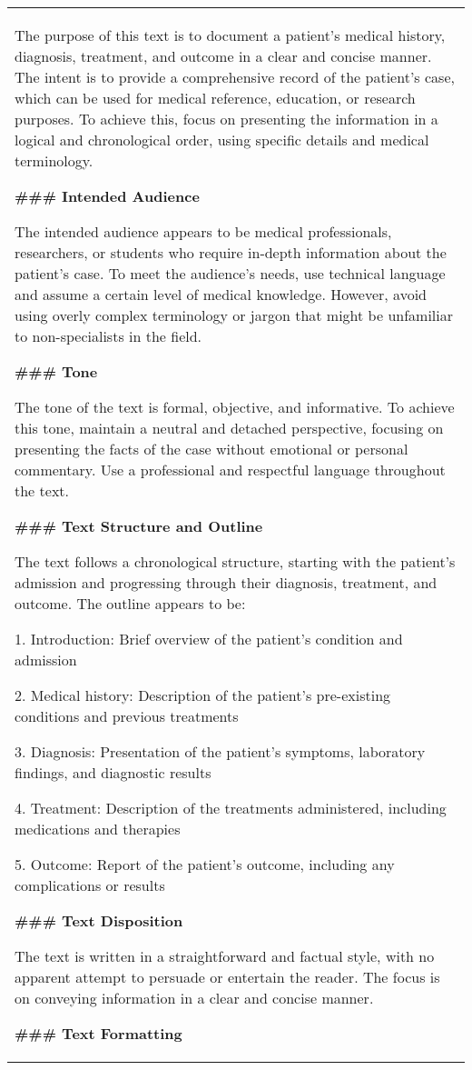 \begin{table*}[ht]
{\begin{tabular}{p{}}
The purpose of this text is to document a patient's medical history, diagnosis, treatment, and outcome in a clear and concise manner. The intent is to provide a comprehensive record of the patient's case, which can be used for medical reference, education, or research purposes. To achieve this, focus on presenting the information in a logical and chronological order, using specific details and medical terminology.

\textbf{\#\#\# Intended Audience}

The intended audience appears to be medical professionals, researchers, or students who require in-depth information about the patient's case. To meet the audience's needs, use technical language and assume a certain level of medical knowledge. However, avoid using overly complex terminology or jargon that might be unfamiliar to non-specialists in the field.

\textbf{\#\#\# Tone}

The tone of the text is formal, objective, and informative. To achieve this tone, maintain a neutral and detached perspective, focusing on presenting the facts of the case without emotional or personal commentary. Use a professional and respectful language throughout the text.

\textbf{\#\#\# Text Structure and Outline}

The text follows a chronological structure, starting with the patient's admission and progressing through their diagnosis, treatment, and outcome. The outline appears to be:

1. Introduction: Brief overview of the patient's condition and admission

2. Medical history: Description of the patient's pre-existing conditions and previous treatments

3. Diagnosis: Presentation of the patient's symptoms, laboratory findings, and diagnostic results

4. Treatment: Description of the treatments administered, including medications and therapies

5. Outcome: Report of the patient's outcome, including any complications or results

\textbf{\#\#\# Text Disposition}

The text is written in a straightforward and factual style, with no apparent attempt to persuade or entertain the reader. The focus is on conveying information in a clear and concise manner.

\textbf{\#\#\# Text Formatting}


\end{tabular}}
\end{table*}

